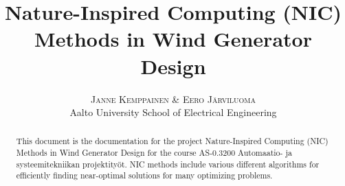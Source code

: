 \documentclass[twoside]{article}
\title{\vspace{-15mm}\fontsize{24pt}{10pt}\selectfont\textbf{Nature-Inspired Computing (NIC) Methods in Wind Generator Design}} %
\author{
\large
\textsc{Janne Kemppainen \& Eero J\"arviluoma}\\[2mm] %
\normalsize Aalto University School of Electrical Engineering \\ %
\vspace{-5mm}
}
\date{}
\begin{document}
\maketitle %

\thispagestyle{fancy} %


\begin{abstract}

\noindent This document is the documentation for the project Nature-Inspired Computing (NIC) Methods in Wind Generator Design for the course AS-0.3200 Automaatio- ja systeemitekniikan projektity\"ot. NIC methods include various different algorithms for efficiently finding near-optimal solutions for many optimizing problems.

\end{abstract}

\end{document}

